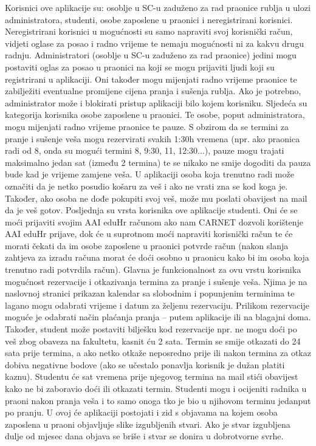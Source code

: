			{Korisnici ove aplikacije su: osoblje u SC-u zaduženo za rad praonice rublja u ulozi administratora,
			studenti, osobe zaposlene u praonici i neregistrirani korisnici.
			Neregistrirani korisnici u mogućnosti su samo napraviti svoj korisnički račun, vidjeti oglase za posao i
			radno vrijeme te nemaju mogućnosti ni za kakvu drugu radnju.
			Administratori (osoblje u SC-u zaduženo za rad praonice) jedini mogu postaviti oglas za posao u praonici
			na koji se mogu prijaviti ljudi koji su registrirani u aplikaciji. Oni također mogu mijenjati radno vrijeme
			praonice te zabilježiti eventualne promijene cijena pranja i sušenja rublja. Ako je potrebno,
			administrator može i blokirati pristup aplikaciji bilo kojem korisniku.
			Sljedeća su kategorija korisnika osobe zaposlene u praonici. Te osobe, poput administratora, mogu
			mijenjati radno vrijeme praonice te pauze. S obzirom da se termini za pranje i sušenje veša mogu
			rezervirati svakih 1:30h vremena (npr. ako praonica radi od 8, onda su mogući termini 8, 9:30, 11,
			12:30...), pauze mogu trajati maksimalno jedan sat (između 2 termina) te se nikako ne smije dogoditi da
			pauza bude kad je vrijeme zamjene veša. U aplikaciji osoba koja trenutno radi može označiti da je netko
			posudio košaru za veš i ako ne vrati zna se kod koga je. Također, ako osoba ne dođe pokupiti svoj veš,
			može mu poslati obavijest na mail da je veš gotov.
			Posljednja su vrsta korisnika ove aplikacije studenti. Oni će se moći prijaviti svojim AAI eduHr računom
			ako nam CARNET dozvoli korištenje AAI eduHr prijave, dok će u suprotnom moći napraviti korisnički
			račun te će morati čekati da im osobe zaposlene u praonici potvrde račun (nakon slanja zahtjeva za
			izradu računa morat će doći osobno u praonicu kako bi im osoba koja trenutno radi potvrdila račun).
			Glavna je funkcionalnost za ovu vrstu korisnika mogućnost rezervacije i otkazivanja termina za pranje i
			sušenje veša. Njima je na naslovnoj stranici prikazan kalendar sa slobodnim i popunjenim terminima te
			lagano mogu odabrati vrijeme i datum za željenu rezervaciju. Prilikom rezervacije moguće je odabrati
			način plaćanja pranja – putem aplikacije ili na blagajni doma. Također, student može postaviti bilješku
			kod rezervacije npr. ne mogu doći po veš zbog obaveza na fakultetu, kasnit ću 2 sata. Termin se smije
			otkazati do 24 sata prije termina, a ako netko otkaže neposredno prije ili nakon termina za otkaz dobiva
			negativne bodove (ako se učestalo ponavlja korisnik je dužan platiti kaznu). Studentu će sat vremena
			prije njegovog termina na mail stići obavijest kako ne bi zaboravio doći ili otkazati termin.
			Studenti mogu i ocijeniti radnika u praoni nakon pranja veša i to samo onoga tko je bio u njihovom
			terminu jedanput po pranju.
			U ovoj će aplikaciji postojati i zid s objavama na kojem osoba zaposlena u praoni objavljuje slike
			izgubljenih stvari. Ako je stvar izgubljena dulje od mjesec dana objava se briše i stvar se donira u
			dobrotvorne svrhe. }
		
